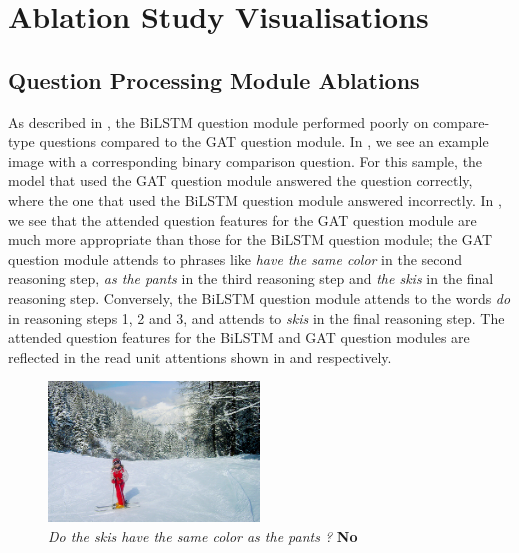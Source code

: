 \chapter{Ablation Study Visualisations}
\label{appendix:ablation_study_visualisations}

\section{Question Processing Module Ablations}
\label{section:question_processing_module_ablation_visualisations}

As described in \subsectionautorefname{ \ref{subsec:question_module_ablations}}, the BiLSTM question module performed poorly on compare-type questions compared to the GAT question module. In \figureautorefname{ \ref{fig:question_ablation_sample}}, we see an example image with a corresponding binary comparison question. For this sample, the model that used the GAT question module answered the question correctly, where the one that used the BiLSTM question module answered incorrectly. In \figureautorefname{ \ref{fig:bilstm_gat_control_attention_maps}}, we see that the attended question features for the GAT question module are much more appropriate than those for the BiLSTM question module; the GAT question module attends to phrases like \textit{have the same color} in the second reasoning step, \textit{as the pants} in the third reasoning step and \textit{the skis} in the final reasoning step. Conversely, the BiLSTM question module attends to the words \textit{do} in reasoning steps 1, 2 and 3, and attends to \textit{skis} in the final reasoning step. The attended question features for the BiLSTM and GAT question modules are reflected in the read unit attentions shown in \figureautorefname{ \ref{fig:bilstm_read_attention_maps}} and \figureautorefname{ \ref{fig:gat_read_attention_maps}} respectively.

\begin{figure}[htbp]
    \centering
    \includegraphics[width=0.5\textwidth]{figures/qav/skipants.png}
    \caption[A sample compare-type question and its correponding image.]{\textit{Do the skis have the same color as the pants ?} \textbf{No}}
    \label{fig:question_ablation_sample}
\end{figure}

